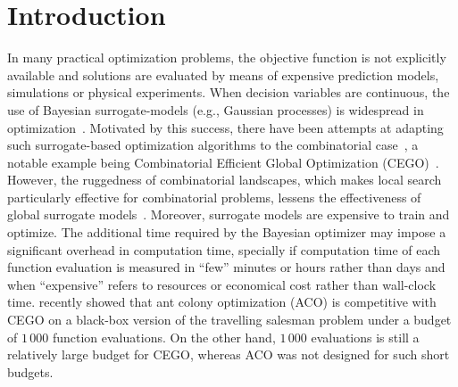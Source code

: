 \documentclass[sigconf,dvipsnames]{acmart}
\begin{document}


\maketitle



\section{Introduction}

In many practical optimization problems, the objective function is not
explicitly available and solutions are evaluated by means of expensive
prediction models, simulations or physical experiments. When decision variables
are continuous, the use of Bayesian surrogate-models (e.g., Gaussian processes)
is widespread in
optimization~\citep{JonSchWel98go,ForKea2009surrogate}. Motivated by this
success, there have been attempts at adapting such surrogate-based optimization
algorithms to the combinatorial case~\cite{MorKat2011:evo}, a notable example being Combinatorial
Efficient Global Optimization
(CEGO)~\citep{ZaeStoBar2014:ppsn,ZaeStoFriFisNauBar2014}. However, the
ruggedness of combinatorial landscapes, which makes local search particularly
effective for combinatorial problems, lessens the effectiveness of global
surrogate models~\citep{EriPeaGar2019scalable}. Moreover, surrogate models are
expensive to train and optimize. The additional time required by the Bayesian
optimizer may impose a significant overhead in computation time, specially if
computation time of each function evaluation is measured in ``few'' minutes or
hours rather than days and when ``expensive'' refers to resources or economical
cost rather than wall-clock time. \citet{PerLopStu2015si} recently showed that
ant colony optimization (ACO) %
is competitive with CEGO
on a black-box version of the travelling salesman problem under a budget of
$1\,000$ function evaluations.  On the other hand, $1\,000$ evaluations is
still a relatively large budget for CEGO, whereas ACO was not designed for such
short budgets.
\end{document}
